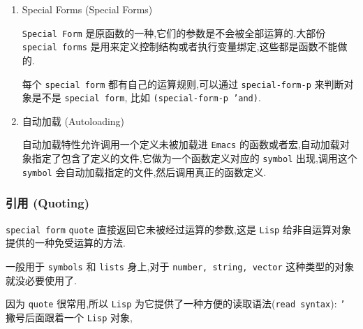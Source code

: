 \documentclass[11pt]{article}
\begin{document}
\begin{enumerate}
一个宏调用是以运算完展开式为结束,然而,并非一得到宏的展开式就马上进行运算,因为其它 \texttt{Lisp} 的程序也会展开宏调用,并且它们"可能"会运算展开式.

通常,宏的参数不会在计算宏的展开式中进行计算,而是应该做为宏的展开式的一部分,在展开式被运算的时候一起被运算.

\begin{verbatim}
(defmacro mcadr (x)
  (list 'car (list 'cdr x)))
;; or using backquote

(defmacro mcadr (x)
  `(car (cdr ,x)))


(mcadr (cons 0 '(1 2 3))) ;; 展开式是 (car (cdr (cons 0 '(1 2 3))))
\end{verbatim}

注意上面上面的展示式有 \texttt{(cons 0 '(1 2 3))},与宏调用发生时候传入的参数是一样的,并不是被运算后的 \texttt{'(0 1 2 3)}.


\item Special Forms (Special Forms)
\label{sec:orgce4d77a}

\texttt{Special Form} 是原函数的一种,它们的参数是不会被全部运算的.大部份 \texttt{special forms} 是用来定义控制结构或者执行变量绑定,这些都是函数不能做的.

每个 \texttt{special form} 都有自己的运算规则,可以通过 \texttt{special-form-p} 来判断对象是不是 \texttt{special form}, 比如 \texttt{(special-form-p 'and)}.


\item 自动加载 (Autoloading)
\label{sec:org5845c43}

自动加载特性允许调用一个定义未被加载进 \texttt{Emacs} 的函数或者宏,自动加载对象指定了包含了定义的文件,它做为一个函数定义对应的 \texttt{symbol} 出现,调用这个 \texttt{symbol} 会自动加载指定的文件,然后调用真正的函数定义.
\end{enumerate}



\subsubsection{引用 (Quoting)}
\label{sec:org2f6eba5}

\texttt{special form} \texttt{quote} 直接返回它未被经过运算的参数,这是 \texttt{Lisp} 给非自运算对象提供的一种免受运算的方法.

一般用于 \texttt{symbols} 和 \texttt{lists} 身上,对于 \texttt{number, string, vector} 这种类型的对象就没必要使用了.

因为 \texttt{quote} 很常用,所以 \texttt{Lisp} 为它提供了一种方便的读取语法(\texttt{read syntax}): \texttt{'} 撇号后面跟着一个 \texttt{Lisp} 对象,
\end{document}
